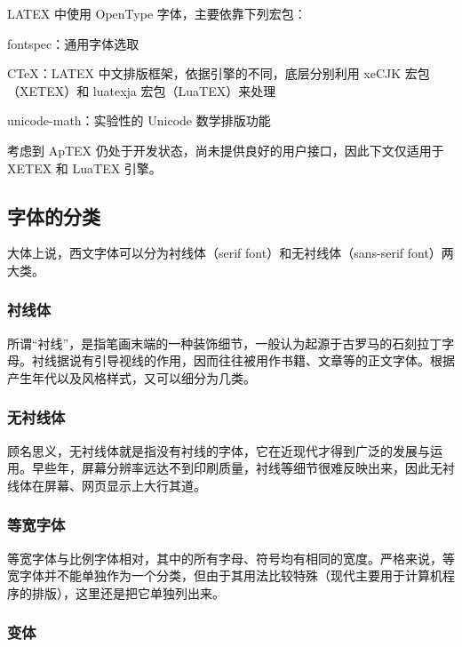 LATEX 中使用 OpenType 字体，主要依靠下列宏包：

\begin{compactitems}
  \item fontspec：通用字体选取
  \item CTeX：LATEX 中文排版框架，依据引擎的不同，底层分别利用 xeCJK 宏包（X⁠E⁠TEX）和 luatexja 宏包（Lua­TEX）来处理
  \item unicode-math：实验性的 Unicode 数学排版功能
\end{compactitems}

考虑到 Ap­TEX 仍处于开发状态，尚未提供良好的用户接口，因此下文仅适用于 X⁠E⁠TEX 和 Lua­TEX 引擎。

\subsection{字体的分类}

大体上说，西文字体可以分为衬线体（serif font）和无衬线体（sans-serif font）两大类。

\subsubsection{衬线体}

所谓“衬线”，是指笔画末端的一种装饰细节，一般认为起源于古罗马的石刻拉丁字母。衬线据说有引导视线的作用，因而往往被用作书籍、文章等的正文字体。根据产生年代以及风格样式，又可以细分为几类。

\subsubsection{无衬线体}

顾名思义，无衬线体就是指没有衬线的字体，它在近现代才得到广泛的发展与运用。早些年，屏幕分辨率远达不到印刷质量，衬线等细节很难反映出来，因此无衬线体在屏幕、网页显示上大行其道。

\subsubsection{等宽字体}

等宽字体与比例字体相对，其中的所有字母、符号均有相同的宽度。严格来说，等宽字体并不能单独作为一个分类，但由于其用法比较特殊（现代主要用于计算机程序的排版），这里还是把它单独列出来。

\subsubsection{变体}

